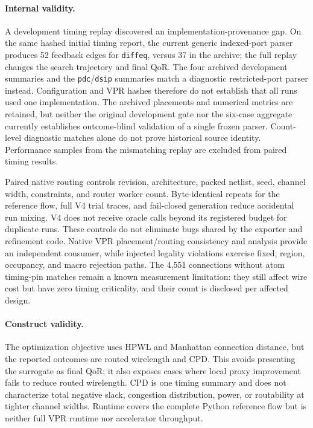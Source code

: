 \documentclass[sigconf,anonymous,review]{acmart}
\newcommand{\vpr}{\textsc{VPR}}
\begin{document}
\paragraph{Internal validity.}
A development timing replay discovered an implementation-provenance gap.
On the same hashed initial timing report, the current generic indexed-port
parser produces 52 feedback edges for \texttt{diffeq}, versus 37 in the archive;
the full replay changes the search trajectory and final QoR.  The four
archived development summaries and the \texttt{pdc}/\texttt{dsip} summaries
match a diagnostic restricted-port parser instead.  Configuration and VPR
hashes therefore do not establish that all runs used one implementation.
The archived placements and numerical metrics are retained, but neither the
original development gate nor the six-case aggregate currently establishes
outcome-blind validation of a single frozen parser.  Count-level diagnostic
matches alone do not prove historical source identity.  Performance samples
from the mismatching replay are excluded from paired timing results.

Paired native routing controls revision, architecture, packed netlist, seed,
channel width, constraints, and router worker count.  Byte-identical repeats
for the reference flow, full V4 trial traces, and fail-closed generation reduce
accidental run mixing.  V4 does not receive oracle calls beyond its registered
budget for duplicate runs.  These controls do not eliminate bugs shared by the
exporter and refinement code.  Native \vpr{}
placement/routing consistency and analysis provide an independent consumer,
while injected legality violations exercise fixed, region, occupancy, and
macro rejection paths.  The 4,551 connections without atom timing-pin matches
remain a known measurement limitation: they still affect wire cost but have
zero timing criticality, and their count is disclosed per affected design.

\paragraph{Construct validity.}
The optimization objective uses HPWL and Manhattan connection distance, but
the reported outcomes are routed wirelength and CPD.  This avoids presenting
the surrogate as final QoR; it also exposes cases where local proxy
improvement fails to reduce routed wirelength.  CPD is one timing summary and
does not characterize total negative slack, congestion distribution, power,
or routability at tighter channel widths.  Runtime covers the complete Python
reference flow but is neither full \vpr{} runtime nor accelerator throughput.
\end{document}
